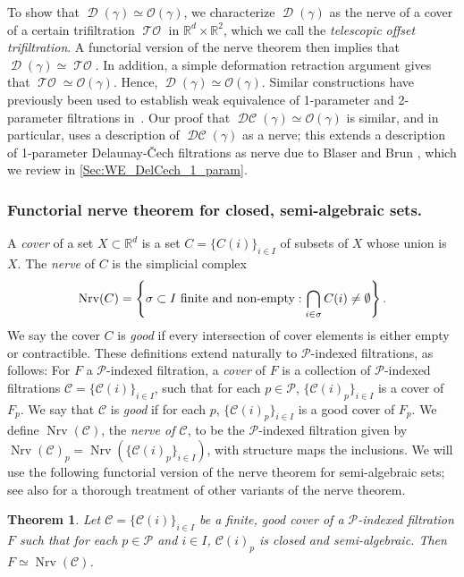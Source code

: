 \documentclass[11pt]{amsart}
\newcommand{\R}{\mathbb{R}} %
\DeclareMathOperator{\Nrv}{Nrv}
\DeclareMathOperator{\Del}{\mathcal{D}}
\DeclareMathOperator{\TelOffset}{\mathcal{TO}}
\DeclareMathOperator{\DelCech}{\mathcal{DC}}
\newcommand{\deff}{\emph}
\newcommand{\Offset}[0]{\mathcal{O}}
\renewcommand{\subparagraph}[1]{\subsubsection*{\textbf{\textup{#1}}}}
\theoremstyle{plain}
\newtheorem{theorem}{Theorem}[section]
\theoremstyle{definition}
\theoremstyle{remark}
\begin{document}
%
To show that  $\Del(\gamma)\simeq \Offset(\gamma)$, we characterize $\Del(\gamma)$ as the nerve of a cover of a certain trifiltration $\TelOffset$ in $\R^{d}\times\R^{2}$, which we call the \emph{telescopic offset trifiltration}.   A functorial version of the nerve theorem \cite{bauerUnifiedViewFunctorial2023} then implies that $\Del(\gamma)\simeq \TelOffset$.  In addition, a simple deformation retraction argument gives that $\TelOffset\simeq \Offset(\gamma)$.  Hence, $\Del(\gamma)\simeq \Offset(\gamma)$.  Similar constructions have previously been used to establish weak equivalence of 1-parameter and 2-parameter filtrations in~\cite{cavanna2015geometric, corbet2023computing}.  Our proof that $\DelCech(\gamma)\simeq \Offset(\gamma)$ is similar, and in particular, uses a description of $\DelCech(\gamma)$ as a nerve; this extends a description of 1-parameter Delaunay-\v Cech filtrations as nerve due to Blaser and Brun \cite{blaser2022relative}, which we review in \cref{Sec:WE_DelCech_1_param}.
%
\subparagraph{Functorial nerve theorem for closed, semi-algebraic sets.}
A \deff{cover}  of a set  $X\subset \R^d$ is a set $C = \{C(i)\}_{i \in I} $ of subsets of $X$ whose union is $X$.
The \deff{nerve} of $C$ is the simplicial complex \[ \Nrv(C) = \left\{ \sigma \subset I \textup{ finite and non-empty} :  \bigcap\limits_{i\in \sigma}{ C(i) } \neq \emptyset \right\}.\]
We say the cover $C$ is \deff{good} if every intersection of cover elements is either empty or contractible. 
%
These definitions extend naturally to $\mathcal{P}$-indexed filtrations, as follows: For $F$ a $\mathcal{P}$-indexed filtration, a \deff{cover} of $F$ is a collection of $\mathcal{P}$-indexed filtrations $\mathcal C = \{\mathcal C{(i)}\}_{i \in I} $, such that for each $p\in \mathcal P$, $\{\mathcal C(i)_p\}_{i\in I}$ is a cover of $F_p$.  We say that $\mathcal C $ is \deff{good} if for each $p$, $\{\mathcal C(i)_p\}_{i\in I}$ is a good cover of $F_p$. We define $\Nrv(\mathcal C)$, the \emph{nerve of $\mathcal C$}, to be the $\mathcal{P}$-indexed filtration given by 
$\Nrv(\mathcal C)_p=\Nrv(\{\mathcal C(i)_p\}_{i\in I})$, with structure maps the inclusions.
%
We will use the following functorial version of the nerve theorem for semi-algebraic sets; see also  \cite{bauerUnifiedViewFunctorial2023} for a thorough treatment of other variants of the nerve theorem.  
%
\begin{theorem}\label{Thm:Nerve_Semi_algebraic}
Let $\mathcal C=\{\mathcal C(i)\}_{i\in I}$ be a finite, good cover of a $\mathcal{P}$-indexed filtration $F$ such that 
for each $p\in \mathcal {P}$ and $i\in I$, $\mathcal{C}(i)_p$ is closed and semi-algebraic.  Then $F\simeq \Nrv(\mathcal C)$.  
\end{theorem}
\end{document}
